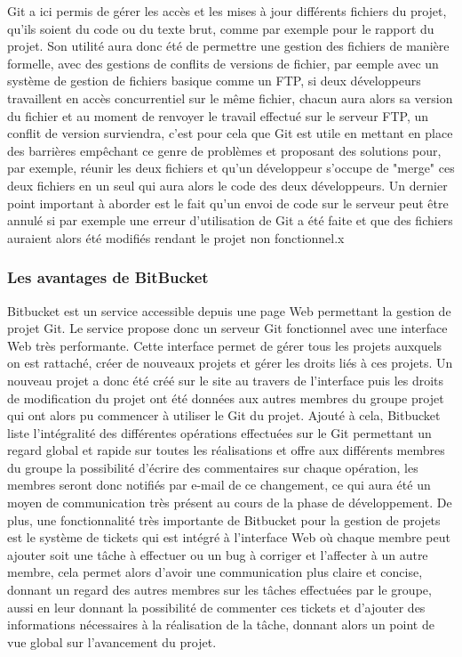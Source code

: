Git a ici permis de gérer les accès et les mises à jour différents fichiers du projet, qu'ils soient du code ou du texte brut, comme par exemple pour le rapport du projet. Son utilité aura donc été de permettre une gestion des fichiers de manière formelle, avec des gestions de conflits de versions de fichier, par eemple avec un système de gestion de fichiers basique comme un FTP, si deux développeurs travaillent en accès concurrentiel sur le même fichier, chacun aura alors sa version du fichier et au moment de renvoyer le travail effectué sur le serveur FTP, un conflit de version surviendra, c'est pour cela que Git est utile en mettant en place des barrières empêchant ce genre de problèmes et proposant des solutions pour, par exemple, réunir les deux fichiers et qu'un développeur s'occupe de "merge" ces deux fichiers en un seul qui aura alors le code des deux développeurs. Un dernier point important à aborder est le fait qu'un envoi de code sur le serveur peut être annulé si par exemple une erreur d'utilisation de Git a été faite et que des fichiers auraient alors été modifiés rendant le projet non fonctionnel.x


\subsubsection{Les avantages de BitBucket}
Bitbucket est un service accessible depuis une page Web permettant la gestion de projet Git. Le service propose donc un serveur Git fonctionnel avec une interface Web très performante. Cette interface permet de gérer tous les projets auxquels on est rattaché, créer de nouveaux projets et gérer les droits liés à ces projets. Un nouveau projet a donc été créé sur le site au travers de l'interface puis les droits de modification du projet ont été données aux autres membres du groupe projet qui ont alors pu commencer à utiliser le Git du projet. Ajouté à cela, Bitbucket liste l'intégralité des différentes opérations effectuées sur le Git permettant un regard global et rapide sur toutes les réalisations et offre aux différents membres du groupe la possibilité d'écrire des commentaires sur chaque opération, les membres seront donc notifiés par e-mail de ce changement, ce qui aura été un moyen de communication très présent au cours de la phase de développement. De plus, une fonctionnalité très importante de Bitbucket pour la gestion de projets est le système de tickets qui est intégré à l'interface Web où chaque membre peut ajouter soit une tâche à effectuer ou un bug à corriger et l'affecter à un autre membre, cela permet alors d'avoir une communication plus claire et concise, donnant un regard des autres membres sur les tâches effectuées par le groupe, aussi en leur donnant la possibilité de commenter ces tickets et d'ajouter des informations nécessaires à la réalisation de la tâche, donnant alors un point de vue global sur l'avancement du projet.
